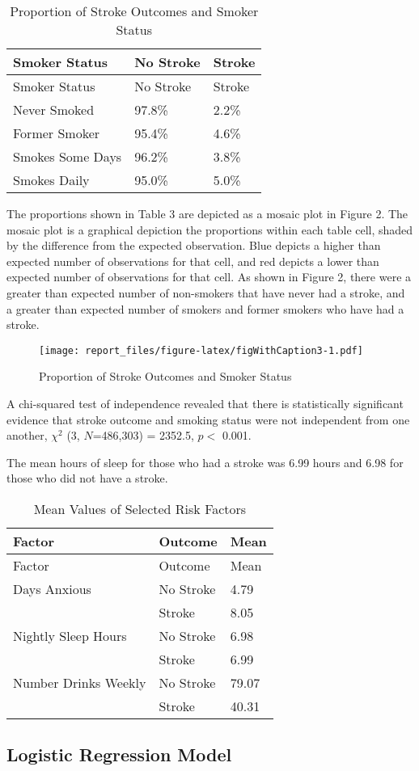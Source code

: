 \documentclass[11pt,]{article}
\begin{document}
\begin{longtable}[]{@{}lll@{}}
\caption{Proportion of Stroke Outcomes and Smoker Status}\tabularnewline
\toprule
Smoker Status & No Stroke & Stroke\tabularnewline
\midrule
\endfirsthead
\toprule
Smoker Status & No Stroke & Stroke\tabularnewline
\midrule
\endhead
Never Smoked & 97.8\% & 2.2\%\tabularnewline
Former Smoker & 95.4\% & 4.6\%\tabularnewline
Smokes Some Days & 96.2\% & 3.8\%\tabularnewline
Smokes Daily & 95.0\% & 5.0\%\tabularnewline
\bottomrule
\end{longtable}

The proportions shown in Table 3 are depicted as a mosaic plot in Figure
2. The mosaic plot is a graphical depiction the proportions within each
table cell, shaded by the difference from the expected observation. Blue
depicts a higher than expected number of observations for that cell, and
red depicts a lower than expected number of observations for that cell.
As shown in Figure 2, there were a greater than expected number of
non-smokers that have never had a stroke, and a greater than expected
number of smokers and former smokers who have had a stroke.

\begin{figure}
\centering
\texttt{[image: report\_files/figure-latex/figWithCaption3-1.pdf]}
\caption{Proportion of Stroke Outcomes and Smoker Status}
\end{figure}

A chi-squared test of independence revealed that there is statistically
significant evidence that stroke outcome and smoking status were not
independent from one another, \(\chi^2\) (3, \(N\)=486,303) = 2352.5,
\(p <\) 0.001.

The mean hours of sleep for those who had a stroke was 6.99 hours and
6.98 for those who did not have a stroke.

\begin{longtable}[]{@{}lll@{}}
\caption{Mean Values of Selected Risk Factors}\tabularnewline
\toprule
Factor & Outcome & Mean\tabularnewline
\midrule
\endfirsthead
\toprule
Factor & Outcome & Mean\tabularnewline
\midrule
\endhead
Days Anxious & No Stroke & 4.79\tabularnewline
& Stroke & 8.05\tabularnewline
Nightly Sleep Hours & No Stroke & 6.98\tabularnewline
& Stroke & 6.99\tabularnewline
Number Drinks Weekly & No Stroke & 79.07\tabularnewline
& Stroke & 40.31\tabularnewline
\bottomrule
\end{longtable}

\subsection{Logistic Regression
Model}\label{logistic-regression-model-1}
\end{document}
